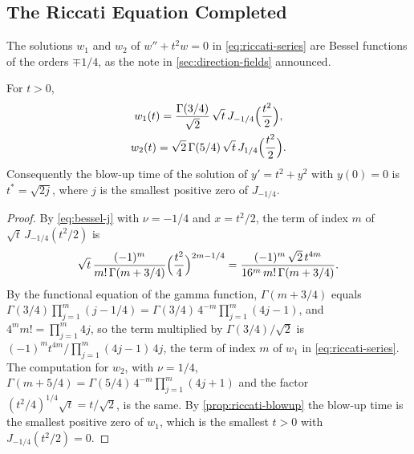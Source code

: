 \subsection{The Riccati Equation Completed}

The solutions $w_1$ and $w_2$ of $w''+t^2w=0$ in \eqref{eq:riccati-series} are Bessel functions of the orders $\mp1/4$, as the note in \cref{sec:direction-fields} announced.

\begin{proposition}
\label{prop:riccati-bessel}
For $t>0$,
\begin{gather*}
w_1(t)=\frac{\Gamma(3/4)}{\sqrt2}\,\sqrt t\,J_{-1/4}\Bigl(\frac{t^2}2\Bigr),\\
w_2(t)=\sqrt2\,\Gamma(5/4)\,\sqrt t\,J_{1/4}\Bigl(\frac{t^2}2\Bigr).
\end{gather*}
Consequently the blow-up time of the solution of $y'=t^2+y^2$ with $y(0)=0$ is $t^*=\sqrt{2j}$, where $j$ is the smallest positive zero of $J_{-1/4}$.
\end{proposition}

\begin{proof}
By \eqref{eq:bessel-j} with $\nu=-1/4$ and $x=t^2/2$, the term of index $m$ of $\sqrt t\,J_{-1/4}(t^2/2)$ is
\[
\sqrt t\,\frac{(-1)^m}{m!\,\Gamma(m+3/4)}\Bigl(\frac{t^2}4\Bigr)^{2m-1/4}=\frac{(-1)^m\,\sqrt2\,t^{4m}}{16^m\,m!\,\Gamma(m+3/4)} .
\]
By the functional equation of the gamma function, $\Gamma(m+3/4)$ equals $\Gamma(3/4)\prod_{j=1}^m(j-1/4)=\Gamma(3/4)\,4^{-m}\prod_{j=1}^m(4j-1)$, and $4^mm!=\prod_{j=1}^m4j$, so the term multiplied by $\Gamma(3/4)/\sqrt2$ is $(-1)^mt^{4m}/\prod_{j=1}^m(4j-1)\,4j$, the term of index $m$ of $w_1$ in \eqref{eq:riccati-series}. The computation for $w_2$, with $\nu=1/4$, $\Gamma(m+5/4)=\Gamma(5/4)\,4^{-m}\prod_{j=1}^m(4j+1)$ and the factor $(t^2/4)^{1/4}\sqrt t=t/\sqrt2$, is the same. By \cref{prop:riccati-blowup} the blow-up time is the smallest positive zero of $w_1$, which is the smallest $t>0$ with $J_{-1/4}(t^2/2)=0$.
\end{proof}

